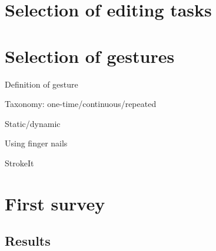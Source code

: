 \documentclass{aes130}
\begin{document}
\section{Selection of editing tasks} \label{sec:EditingTasks}



\section{Selection of gestures} \label{sec:Gestures}

\newcommand{\quarterpic}[1][]{\texttt{[image: ../../de/Befragung/img/\#1]}}
\newcommand{\sixthpic}[1][]{\texttt{[image: ../../de/Befragung/img/\#1]}}

Definition of gesture

Taxonomy: one-time/continuous/repeated

Static/dynamic

Using finger nails

StrokeIt


\section{First survey} \label{sec:Survey1}


\subsection{Results} \label{sec:Survey1Results}
\end{document}
